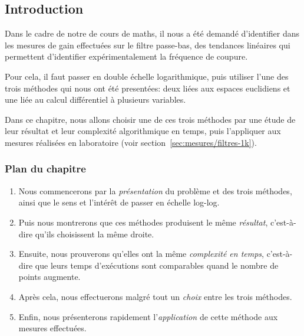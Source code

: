\subsection*{Introduction}

Dans le cadre de notre de cours de maths,
il nous a été demandé d'identifier dans les mesures de gain effectuées
sur le filtre passe-bas,
des tendances linéaires qui permettent d'identifier expérimentalement
la fréquence de coupure.

Pour cela, il faut passer en double échelle logarithmique,
puis utiliser l'une des trois méthodes qui nous ont été presentées:
deux liées aux espaces euclidiens et une liée au calcul différentiel
à plusieurs variables.

Dans ce chapitre, nous allons choisir une de ces trois méthodes
par une étude de leur résultat et leur complexité algorithmique en temps,
puis l'appliquer aux mesures réalisées en laboratoire
(voir section~\ref{sec:mesures/filtres-1k}).

\subsubsection*{Plan du chapitre}
\begin{enumerate}
    \item Nous commencerons par la \emph{présentation} du problème et
        des trois méthodes,
        ainsi que le sens et l'intérêt de passer en échelle log-log.
    \item Puis nous montrerons que ces méthodes produisent
        le même \emph{résultat},
        c'est-à-dire qu'ils choisissent la même droite.
    \item Ensuite, nous prouverons qu'elles ont la même \emph{complexité
        en temps}, c'est-à-dire que leurs temps d'exécutions sont comparables
        quand le nombre de points augmente.
    \item Après cela, nous effectuerons malgré tout un \emph{choix}
        entre les trois méthodes.
    \item Enfin, nous présenterons rapidement l'\emph{application}
        de cette méthode aux mesures effectuées.
\end{enumerate}
